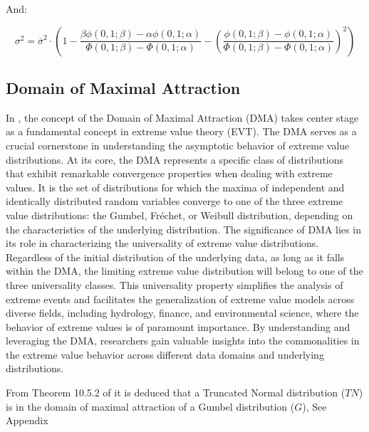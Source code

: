 And:

\begin{equation}
\sigma^2 = \overline{\sigma}^2 \cdot \left( 1 - \frac{\beta \phi(0,1;\beta)- \alpha \phi(0,1;\alpha)}{\Phi(0,1;\beta)-\Phi(0,1;\alpha)} - \left( \frac{\phi(0,1;\beta)-\phi(0,1;\alpha)}{\Phi(0,1;\beta)-\Phi(0,1;\alpha)} \right)^2 \right)
\label{eq:sigma2Def}
\end{equation}

\subsection{Domain of Maximal Attraction}

In \cite{david2004order}, the concept of the Domain of Maximal Attraction (DMA) takes center stage as a fundamental concept in extreme value theory (EVT). The DMA serves as a crucial cornerstone in understanding the asymptotic behavior of extreme value distributions. At its core, the DMA represents a specific class of distributions that exhibit remarkable convergence properties when dealing with extreme values. It is the set of distributions for which the maxima of independent and identically distributed random variables converge to one of the three extreme value distributions: the Gumbel, Fréchet, or Weibull distribution, depending on the characteristics of the underlying distribution. The significance of DMA lies in its role in characterizing the universality of extreme value distributions. Regardless of the initial distribution of the underlying data, as long as it falls within the DMA, the limiting extreme value distribution will belong to one of the three universality classes. This universality property simplifies the analysis of extreme events and facilitates the generalization of extreme value models across diverse fields, including hydrology, finance, and environmental science, where the behavior of extreme values is of paramount importance. By understanding and leveraging the DMA, researchers gain valuable insights into the commonalities in the extreme value behavior across different data domains and underlying distributions.

From Theorem 10.5.2 of \cite{david2004order} it is deduced that a Truncated Normal distribution ($TN$) is in the domain of maximal attraction of a Gumbel distribution ($G$), See Appendix %

